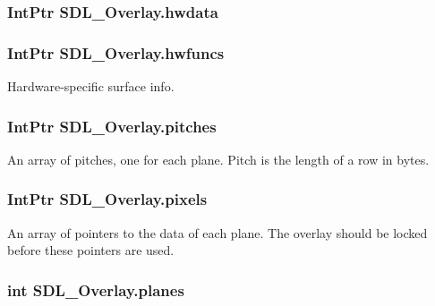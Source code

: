 \hypertarget{struct_s_d_l___overlay_a4f88c41e139b1351bf8a0e47f1ea5423}{
\subsubsection[{hwdata}]{\setlength{\rightskip}{0pt plus 5cm}IntPtr {\bf SDL\_\-Overlay.hwdata}}}
\label{struct_s_d_l___overlay_a4f88c41e139b1351bf8a0e47f1ea5423}
\hypertarget{struct_s_d_l___overlay_aaeac08fb69a351324a87dc4af470e8eb}{
\subsubsection[{hwfuncs}]{\setlength{\rightskip}{0pt plus 5cm}IntPtr {\bf SDL\_\-Overlay.hwfuncs}}}
\label{struct_s_d_l___overlay_aaeac08fb69a351324a87dc4af470e8eb}


Hardware-\/specific surface info. 

\hypertarget{struct_s_d_l___overlay_acebfa6c0acae264fc7c5520d8d78341f}{
\subsubsection[{pitches}]{\setlength{\rightskip}{0pt plus 5cm}IntPtr {\bf SDL\_\-Overlay.pitches}}}
\label{struct_s_d_l___overlay_acebfa6c0acae264fc7c5520d8d78341f}


An array of pitches, one for each plane. Pitch is the length of a row in bytes. 

\hypertarget{struct_s_d_l___overlay_a78e601a5c563f20818d120c72a3213b1}{
\subsubsection[{pixels}]{\setlength{\rightskip}{0pt plus 5cm}IntPtr {\bf SDL\_\-Overlay.pixels}}}
\label{struct_s_d_l___overlay_a78e601a5c563f20818d120c72a3213b1}


An array of pointers to the data of each plane. The overlay should be locked before these pointers are used. 

\hypertarget{struct_s_d_l___overlay_ae03a414d95c2d83ca7dc09dd11295feb}{
\subsubsection[{planes}]{\setlength{\rightskip}{0pt plus 5cm}int {\bf SDL\_\-Overlay.planes}}}
\label{struct_s_d_l___overlay_ae03a414d95c2d83ca7dc09dd11295feb}



